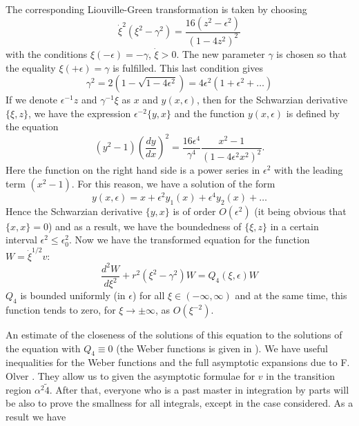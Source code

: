 The corresponding Liouville-Green transformation is taken by choosing
\begin{equation}
\dot{\xi}^2  (\xi^2 - \gamma^2) = \frac{16(z^2 - \epsilon^2)}{(1-4z^2)^2} \label{art7-eq7.48}
\end{equation}
with the conditions $\xi(-\epsilon) = - \gamma$, $\dot{\xi} >0$. The new parameter $\gamma$ is chosen so that the equality $\xi (+\epsilon) = \gamma$ is fulfilled. This last condition gives 
\begin{equation}
\gamma^2 = 2 (1-\sqrt{1-4\epsilon^2}) = 4 \epsilon^2 (1+ \epsilon^2 + \ldots) \label{art7-eq7.49}
\end{equation}
If we denote $\epsilon^{-1} z$ and $\gamma^{-1} \xi$ as $x$ and $y (x, \epsilon)$, then for the Schwarzian derivative $\{\xi, z\}$, we have the expression $\epsilon^{-2} \{y, x\}$ and the function $y(x, \epsilon)$ is defined by the equation 
\begin{equation}
(y^2 -1) \left(\frac{dy}{dx} \right)^2 = \frac{16\epsilon^4}{\gamma^4} \frac{x^2 -1}{(1-4 \epsilon^2 x^2)^2} . \label{art7-eq7.50}
\end{equation}
Here the function on the right hand side is a power series in $\epsilon^2$ with the leading term $(x^2 -1)$. For this reason, we have a solution of the form 
\begin{equation}
y (x, \epsilon) = x + \epsilon^2 y_1 (x) + \epsilon^4 y_2 (x) + \ldots \label{art7-eq7.51}
\end{equation}
Hence the Schwarzian derivative $\{y, x\}$ is of order $O(\epsilon^2)$ (it being obvious that $\{x, x\} =0$) and as a result, we have the boundedness of $\{\xi, z\}$ in a certain interval $\epsilon^2 \leqslant \epsilon^2_0$. Now we have the transformed equation for the function $W = \dot{\xi}^{1/2} v$:
\begin{equation}
\frac{d^2 W}{d\xi^2} + r^2 (\xi^2 - \gamma^2) W = Q_4 (\xi, \epsilon) W \label{art7-eq7.52}
\end{equation}
 $Q_4$ is bounded uniformly (in $\epsilon$) for all $\xi \in (-\infty, \infty)$ and at the same time, this function tends to zero, for $\xi \to \pm \infty$, as $O(\xi^{-2})$.

An estimate of the closeness of the solutions of this equation to the solutions of the equation with $Q_4 \equiv 0$ (the Weber functions is given  in \cite{art-key7}). We have useful inequalities for the Weber functions and the full asymptotic expansions due to F. Olver \cite{art7-key}. They allow us to given the asymptotic formulae for $v$ in the transition region $\alpha^2 \tilde 4$. After that, everyone who is a past master in integration by parts will be also to prove the smallness for all integrals, except in the case considered. As a result we have 

